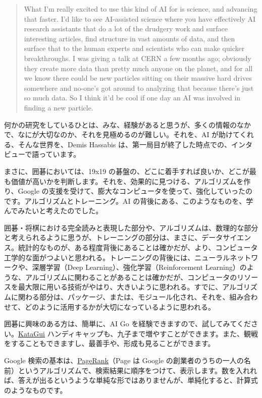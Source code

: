 \documentclass[
]{bxjsbook}
\theoremstyle{definition}
\theoremstyle{definition}
\theoremstyle{definition}
\theoremstyle{definition}
\theoremstyle{remark}
\begin{document}
\begin{quote}
What I'm really excited to use this kind of AI for is science, and advancing that faster. I'd like to see AI-assisted science where you have effectively AI research assistants that do a lot of the drudgery work and surface interesting articles, find structure in vast amounts of data, and then surface that to the human experts and scientists who can make quicker breakthroughs. I was giving a talk at CERN a few months ago; obviously they create more data than pretty much anyone on the planet, and for all we know there could be new particles sitting on their massive hard drives somewhere and no-one's got around to analyzing that because there's just so much data. So I think it'd be cool if one day an AI was involved in finding a new particle.
\end{quote}

何かの研究をしているひとは、みな、経験があると思うが、多くの情報のなかで、なにが大切なのか、それを見極めるのが難しい。それを、AI が助けてくれる、そんな世界を、Demis Hassabis は、第一局目が終了した時点での、インタビューで語っています。

まさに、囲碁においては、19x19 の碁盤の、どこに着手すれば良いか、どこが最も価値が高いかを判断します。それを、効果的に見つける、アルゴリズムを作り、Google の支援を受けて、膨大なコンピュータを使って、強化していったのです。アルゴリズムとトレーニング。AI の背後にある、このようなものを、学んでみたいと考えたのでした。

囲碁・将棋における完全読みと表現した部分や、アルゴリズムは、数理的な部分と考えられるように思うが、トレーニングの部分は、まさに、データサイエンス。統計的なものが、ある程度背後にあることは確かだが、より、コンピュータ工学的な面がつよいと思われる。トレーニングの背後には、ニューラルネットワークや、深層学習（Deep Learning）、強化学習（Reinforcement Learning）のような、アルゴリズムに関わることがあることは確かだが、コンピュータのリソースを最大限に用いる技術がやはり、大きいように思われる。すでに、アルゴリズムに関わる部分は、パッケージ、または、モジュール化され、それを、組み合わせて、どのように活用するかが大切になっているように思われる。

囲碁に興味のある方は、簡単に、AI Go を経験できますので、試してみてください。\href{https://katagui.baduk.club/}{KataGui} ハンディキャップも、九子まで増やすことができます。また、観戦をすることもできますし、最善手や、形成も見ることができます。

Google 検索の基本は、\href{https://en.wikipedia.org/wiki/PageRank}{PageRank}（Page は Google の創業者のうちの一人の名前）というアルゴリズムで、検索結果に順序をつけて、表示します。数を入れれば、答えが出るというような単純な形ではありませんが、単純化すると、計算式のようなものです。
\end{document}
